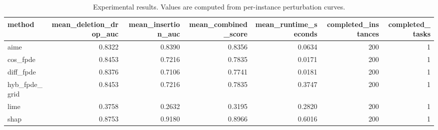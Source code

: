 \begin{table}[t]
\caption{Experimental results. Values are computed from per-instance perturbation curves.}
\label{tab:main_results_computed}
\centering
\begin{tabular}{lrrrrrr}
\toprule
method & mean\_deletion\_drop\_auc & mean\_insertion\_auc & mean\_combined\_score & mean\_runtime\_seconds & completed\_instances & completed\_tasks \\
\midrule
aime & 0.8322 & 0.8390 & 0.8356 & 0.0634 & 200 & 1 \\
cos\_fpde & 0.8453 & 0.7216 & 0.7835 & 0.0171 & 200 & 1 \\
diff\_fpde & 0.8376 & 0.7106 & 0.7741 & 0.0181 & 200 & 1 \\
hyb\_fpde\_grid & 0.8453 & 0.7216 & 0.7835 & 0.3747 & 200 & 1 \\
lime & 0.3758 & 0.2632 & 0.3195 & 0.2820 & 200 & 1 \\
shap & 0.8753 & 0.9180 & 0.8966 & 0.6016 & 200 & 1 \\
\bottomrule
\end{tabular}

\end{table}
